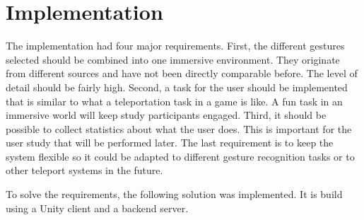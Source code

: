 \chapter{Implementation}
The implementation had four major requirements. First, the different gestures selected should be combined into one immersive environment. They originate from different sources and have not been directly comparable before. The level of detail should be fairly high. Second, a task for the user should be implemented that is similar to what a teleportation task in a game is like. A fun task in an immersive world will keep study participants engaged. Third, it should be possible to collect statistics about what the user does. This is important for the user study that will be performed later. The last requirement is to keep the system flexible so it could be adapted to different gesture recognition tasks or to other teleport systems in the future.

To solve the requirements, the following solution was implemented. It is build using a Unity client and a backend server.